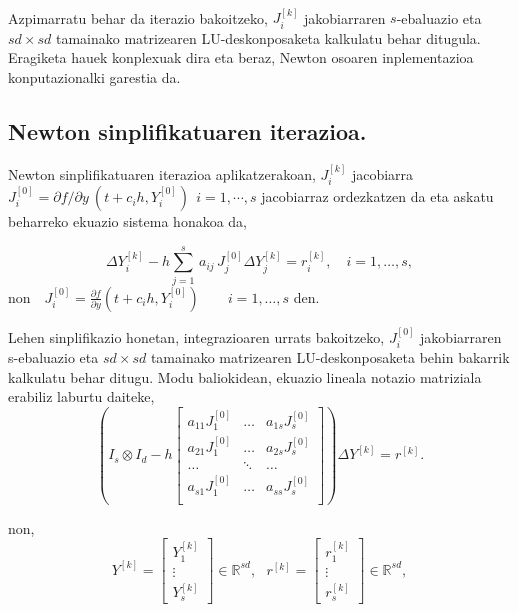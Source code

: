 \paragraph*{}Azpimarratu behar da iterazio bakoitzeko,  $J_i^{[k]}$ jakobiarraren $s$-ebaluazio eta $sd \times sd$ tamainako matrizearen LU-deskonposaketa kalkulatu behar ditugula. Eragiketa hauek konplexuak dira eta beraz, Newton osoaren inplementazioa konputazionalki garestia da. 

\subsection*{Newton sinplifikatuaren iterazioa.}

Newton sinplifikatuaren iterazioa aplikatzerakoan, $J_i^{[k]}$ jacobiarra $J_i^{[0]}=\partial f / \partial y \ (t+c_ih, Y_i^{[0]}) \ \ i=1,\cdots,s$ jacobiarraz ordezkatzen da eta askatu beharreko ekuazio sistema honakoa da,

\begin{equation*}
\Delta Y_{i}^{[k]}  - h \sum_{j=1}^{s}\, a_{ij}\, J_j^{[0]} \Delta Y_{j}^{[k]} = r_i^{[k]}, \quad  i=1 ,\ldots, s,
\end{equation*}
$\mbox{non} \quad  J_i^{[0]}=\frac{\partial f}{\partial y}(t + c_i h,Y_{i}^{[0]}) \quad \quad  i=1,\ldots, s$ den.

Lehen sinplifikazio honetan, integrazioaren urrats bakoitzeko,  $J_i^{[0]}$ jakobiarraren s-ebaluazio eta $sd \times sd$ tamainako matrizearen LU-deskonposaketa behin bakarrik kalkulatu behar ditugu. Modu baliokidean, ekuazio lineala notazio matriziala erabiliz laburtu daiteke,
\begin{equation*}
\label{eq:805}
\left (I_s \otimes I_d - h  
\begin{bmatrix}
a_{11}  J_1^{[0]} & \dots & a_{1s}  J_s^{[0]} \\
a_{21}  J_1^{[0]} & \dots & a_{2s}  J_s^{[0]} \\
\dots            & \ddots & \dots \\
a_{s1}  J_1^{[0]} & \dots & a_{ss}  J_s^{[0]} \\ 
\end{bmatrix} \right) \Delta Y^{[k]} =r^{[k]}.
\end{equation*}

non,
\begin{equation*}
\label{eq:806}
Y^{[k]}=\begin{bmatrix}
Y_1^{[k]} \\
\vdots \\
Y_s^{[k]}
\end{bmatrix} \in \mathbb{R}^{sd}, \ \ \
r^{[k]}=\begin{bmatrix}
r_1^{[k]} \\
\vdots \\
r_s^{[k]}
\end{bmatrix} \in \mathbb{R}^{sd},
\end{equation*}

